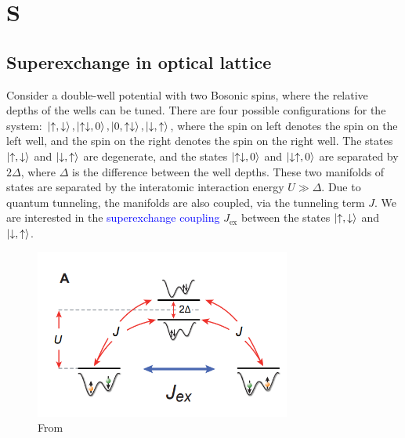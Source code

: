 \documentclass{book}
\theoremstyle{definition}
\begin{document}
\chapter*{S}














\section*{Superexchange in optical lattice}


Consider a double-well potential with two Bosonic spins, where the relative depths of the wells can be tuned. There are four possible configurations for the system: $\ket{\uparrow, \downarrow}, \ket{\uparrow\downarrow,0}, \ket{0,\uparrow\downarrow}, \ket{\downarrow, \uparrow}$, where the spin on left denotes the spin on the left well, and the spin on the right denotes the spin on the right well. The states $\ket{\uparrow,\downarrow}$ and $\ket{\downarrow,\uparrow}$ are degenerate, and the states $\ket{\uparrow\downarrow,0}$ and $\ket{\downarrow\uparrow,0}$ are separated by $2\Delta$, where $\Delta$ is the difference between the well depths. These two manifolds of states are separated by the interatomic interaction energy $U \gg \Delta$.  Due to quantum tunneling, the manifolds are also coupled, via the tunneling term $J$. We are interested in the \textcolor{blue}{superexchange coupling} $J_{\text{ex}}$ between the states $\ket{\uparrow,\downarrow}$ and $\ket{\downarrow, \uparrow}$. 



\begin{figure}[!htb]
	\centering
	\includegraphics[width=0.75\textwidth]{images/superex_1}
	\caption{From \cite{trotzky2008time}}
\end{figure} 
\end{document}

